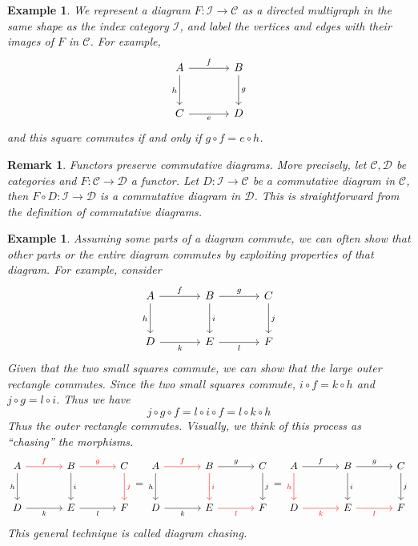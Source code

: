 \documentclass[10pt]{book}
\theoremstyle{bookplain}
\theoremstyle{bookdefinition}
\newtheorem{example}[theorem]{Example}
\theoremstyle{bookremark}
\newtheorem{remark}[theorem]{Remark}
\begin{document}
\begin{example}We represent a diagram $F:\mathscr{I}\rightarrow \mathscr{C}$ as a directed multigraph in the same shape as the index category $\mathscr{I}$, and label the vertices and edges with their images of $F$ in $\mathscr{C}$. For example,
    \[\begin{tikzcd}[sep=large]
	A & B \\
	C & D
	\arrow["f", from=1-1, to=1-2]
	\arrow["h"', from=1-1, to=2-1]
	\arrow["g", from=1-2, to=2-2]
	\arrow["e"', from=2-1, to=2-2]
\end{tikzcd}\]
and this square commutes if and only if $g\circ f=e\circ h$. 
\end{example}
\begin{remark}Functors preserve commutative diagrams. More precisely, let $\mathscr{C},\mathscr{D}$ be categories and $F:\mathscr{C}\rightarrow\mathscr{D}$ a functor. Let $D:\mathscr{I}\rightarrow \mathscr{C}$ be a commutative diagram in $\mathscr{C}$, then $F\circ D:\mathscr{I}\rightarrow \mathscr{D}$ is a commutative diagram in $\mathscr{D}$. 
    This is straightforward from the definition of commutative diagrams.
\end{remark}
\iffalse
\begin{example}Assuming some parts of a diagram commute, we can often show that other parts or the entire diagram commutes by exploiting properties of that diagram. For example, consider
\[
\begin{tikzcd}[sep = large]
A \arrow[d, "h"'] \arrow[r, "f"] & B \arrow[d, "i"] \arrow[r, "g"] & C \arrow[d, "j"] \\
D \arrow[r, "k"']                & E \arrow[r, "l"']               & F               
\end{tikzcd}
\]
Given that the two small squares commute, we can show that the large outer rectangle commutes. Since the two small squares commute, $i\circ f=k\circ h$ and $j\circ g=l\circ i$. Thus we have
\[j\circ g\circ f=l\circ i\circ f=l\circ k\circ h\]
Thus the outer rectangle commutes. Visually, we think of this process as ``chasing'' the morphisms.
\[
\begin{tikzcd}[sep = large]
A \arrow[d, "h"'] \arrow[r, "f", color=red] & B \arrow[d, "i"] \arrow[r, "g", color=red] & C \arrow[d, "j", color=red] \\
D \arrow[r, "k"']                & E \arrow[r, "l"']               & F 
\end{tikzcd}=
\begin{tikzcd}[sep = large]
A \arrow[d, "h"'] \arrow[r, "f", color=red] & B \arrow[d, "i",color=red] \arrow[r, "g"] & C \arrow[d, "j"] \\
D \arrow[r, "k"']                & E \arrow[r, "l"',color=red]               & F 
\end{tikzcd}=
\begin{tikzcd}[sep = large]
A \arrow[d, "h"', color=red] \arrow[r, "f"] & B \arrow[d, "i"] \arrow[r, "g"] & C \arrow[d, "j"] \\
D \arrow[r, "k"',color=red]                & E \arrow[r, "l"',color=red]               & F 
\end{tikzcd}
\]
This general technique is called \textit{diagram chasing}.
\end{example}
\end{document}
